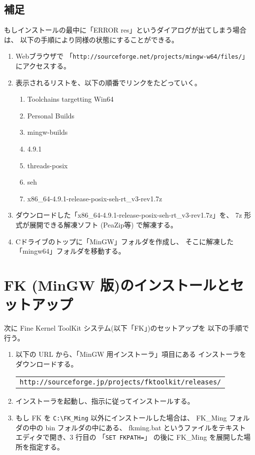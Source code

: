 \documentclass[a4j]{jarticle}
\begin{document}
\subsection*{補足}
もしインストールの最中に「ERROR res」というダイアログが出てしまう場合は、
以下の手順により同様の状態にすることができる。
\begin{enumerate}
 \item Webブラウザで
	「\verb+http://sourceforge.net/projects/mingw-w64/files/+」にアクセスする。

 \item 表示されるリストを、以下の順番でリンクをたどっていく。
 \begin{enumerate}
	\item Toolchains targetting Win64
	\item Personal Builds
	\item mingw-builds
	\item 4.9.1
	\item threads-posix
	\item seh
	\item x86\_64-4.9.1-release-posix-seh-rt\_v3-rev1.7z
 \end{enumerate}

 \item ダウンロードした「x86\_64-4.9.1-release-posix-seh-rt\_v3-rev1.7z」を、
	7z 形式が展開できる解凍ソフト (PeaZip等) で解凍する。

 \item Cドライブのトップに「MinGW」フォルダを作成し、
	そこに解凍した「mingw64」フォルダを移動する。
\end{enumerate}

\section{FK (MinGW 版)のインストールとセットアップ}
次に Fine Kernel ToolKit システム(以下「FK」)のセットアップを
以下の手順で行う。

\begin{enumerate}
\item 以下の URL から、「MinGW 用インストーラ」項目にある
	インストーラをダウンロードする。
	\begin{center}
	\begin{tabular}{c}
	\verb+http://sourceforge.jp/projects/fktoolkit/releases/+
	\end{tabular}
	\end{center}

\item インストーラを起動し、指示に従ってインストールする。
	
\item もし FK を \verb+C:\FK_Ming+ 以外にインストールした場合は、
	FK\_Ming フォルダの中の bin フォルダの中にある、
	fkming.bat というファイルをテキストエディタで開き、3 行目の
	「\verb+SET FKPATH=+」
	の後に FK\_Ming を展開した場所を指定する。
\end{enumerate}
\end{document}
